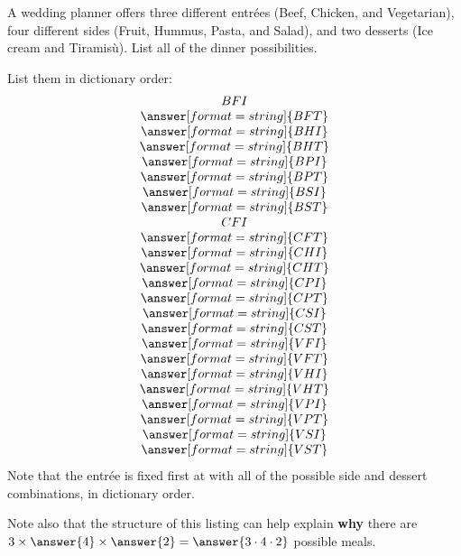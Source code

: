 \documentclass[nooutcomes]{ximera}
\begin{document}
\begin{problem}
A wedding planner offers three different entr\'ees (Beef, Chicken, and Vegetarian), four different sides (Fruit, Hummus, Pasta, and Salad), and two desserts (Ice cream and Tiramis\`u).  List all of the dinner possibilities.  

\begin{solution}
List them in dictionary order: 
\[
\begin{array}{c}
BFI \\
\answer[format=string]{BFT} \\
\answer[format=string]{BHI} \\
\answer[format=string]{BHT} \\
\answer[format=string]{BPI} \\
\answer[format=string]{BPT} \\
\answer[format=string]{BSI} \\
\answer[format=string]{BST} \\
CFI \\
\answer[format=string]{CFT} \\
\answer[format=string]{CHI} \\
\answer[format=string]{CHT} \\
\answer[format=string]{CPI} \\
\answer[format=string]{CPT} \\
\answer[format=string]{CSI} \\
\answer[format=string]{CST} \\
\answer[format=string]{VFI} \\
\answer[format=string]{VFT} \\
\answer[format=string]{VHI} \\
\answer[format=string]{VHT} \\
\answer[format=string]{VPI} \\
\answer[format=string]{VPT} \\
\answer[format=string]{VSI} \\
\answer[format=string]{VST} 
\end{array}
\]
Note that the entr\'ee is fixed first at  with all of the possible side and dessert combinations, in dictionary order.  

Note also that the structure of this listing can help explain \textbf{why} there are 
$3\times\answer{4}\times\answer{2}=\answer{3\cdot 4\cdot 2}$ possible meals.  


\end{solution}
\end{problem}
\end{document}
